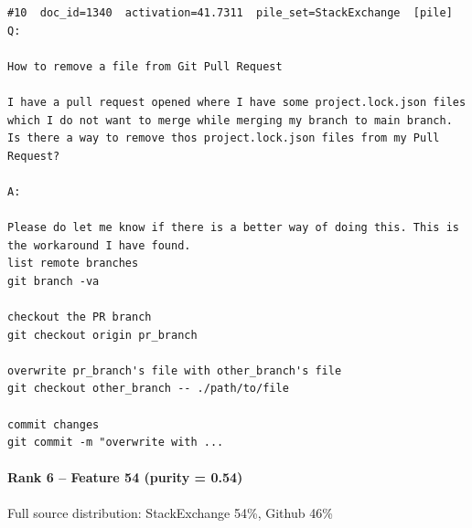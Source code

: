 \begin{verbatim}
#10  doc_id=1340  activation=41.7311  pile_set=StackExchange  [pile]
Q:

How to remove a file from Git Pull Request

I have a pull request opened where I have some project.lock.json files which I do not want to merge while merging my branch to main branch. Is there a way to remove thos project.lock.json files from my Pull Request?

A:

Please do let me know if there is a better way of doing this. This is the workaround I have found.
list remote branches
git branch -va

checkout the PR branch
git checkout origin pr_branch

overwrite pr_branch's file with other_branch's file
git checkout other_branch -- ./path/to/file

commit changes
git commit -m "overwrite with ...

\end{verbatim}

\paragraph*{Rank 6 -- Feature 54 (purity = 0.54)}

Full source distribution: StackExchange 54\%, Github 46\%

